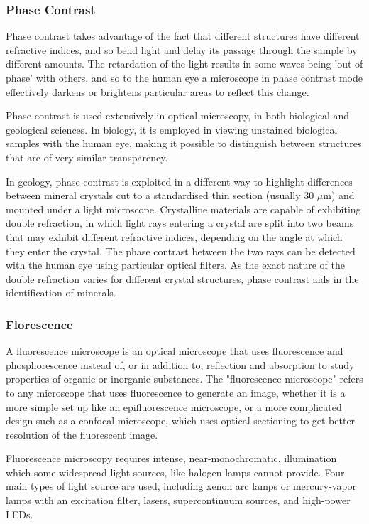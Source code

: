 \documentclass{article}
\begin{document}
\subsubsection{Phase Contrast}

Phase contrast takes advantage of the fact that different structures have different refractive indices, and so bend light and delay its passage through the sample by different amounts. The retardation of the light results in some waves being 'out of phase' with others, and so to the human eye a microscope in phase contrast mode effectively darkens or brightens particular areas to reflect this change.

Phase contrast is used extensively in optical microscopy, in both biological and geological sciences. In biology, it is employed in viewing unstained biological samples with the human eye, making it possible to distinguish between structures that are of very similar transparency.

In geology, phase contrast is exploited in a different way to highlight differences between mineral crystals cut to a standardised thin section (usually 30 $\mu$m) and mounted under a light microscope. Crystalline materials are capable of exhibiting double refraction, in which light rays entering a crystal are split into two beams that may exhibit different refractive indices, depending on the angle at which they enter the crystal. The phase contrast between the two rays can be detected with the human eye using particular optical filters. As the exact nature of the double refraction varies for different crystal structures, phase contrast aids in the identification of minerals.

\subsubsection{Florescence}

A fluorescence microscope is an optical microscope that uses fluorescence and phosphorescence instead of, or in addition to, reflection and absorption to study properties of organic or inorganic substances. The "fluorescence microscope" refers to any microscope that uses fluorescence to generate an image, whether it is a more simple set up like an epifluorescence microscope, or a more complicated design such as a confocal microscope, which uses optical sectioning to get better resolution of the fluorescent image.

Fluorescence microscopy requires intense, near-monochromatic, illumination which some widespread light sources, like halogen lamps cannot provide. Four main types of light source are used, including xenon arc lamps or mercury-vapor lamps with an excitation filter, lasers, supercontinuum sources, and high-power LEDs. 
\end{document}
